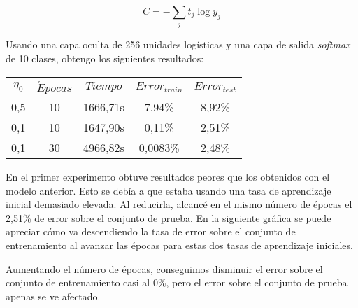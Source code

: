 \begin{equation}
    C = - \sum_j t_j \log y_j
\end{equation}

Usando una capa oculta de 256 unidades logísticas y una capa de salida \textit{softmax} de 10 clases, obtengo los siguientes resultados:

\begin{center}
    \begin{tabular}{ |c|c|c|c|c| } 
        \hline
        $\eta_0$ & $\acute Epocas$ & $Tiempo$ & $Error_{train}$ & $Error_{test}$ \\
        \hline
        0,5      & 10       & 1666,71s &  7,94\%         & 8,92\%         \\
        \hline
        0,1      & 10       & 1647,90s &  0,11\%         & 2,51\%         \\
        \hline
        0,1      & 30       & 4966,82s &  0,0083\%       & 2,48\%         \\
        \hline
    \end{tabular}
\end{center}

En el primer experimento obtuve resultados peores que los obtenidos con el modelo anterior. Esto se debía a que estaba usando una tasa de aprendizaje inicial demasiado elevada. Al reducirla, alcancé en el mismo número de épocas el 2,51\% de error sobre el conjunto de prueba. En la siguiente gráfica se puede apreciar cómo va descendiendo la tasa de error sobre el conjunto de entrenamiento al avanzar las épocas para estas dos tasas de aprendizaje iniciales. 

\begin{center}
\end{center}

Aumentando el número de épocas, conseguimos disminuir el error sobre el conjunto de entrenamiento casi al 0\%, pero el error sobre el conjunto de prueba apenas se ve afectado.